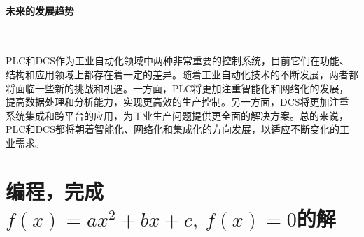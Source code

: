 \documentclass[UTF8]{article}
\begin{document}
\paragraph{未来的发展趋势}~{}

PLC和DCS作为工业自动化领域中两种非常重要的控制系统，目前它们在功能、结构和应用领域上都存在着一定的差异。随着工业自动化技术的不断发展，两者都将面临一些新的挑战和机遇。一方面，PLC将更加注重智能化和网络化的发展，提高数据处理和分析能力，实现更高效的生产控制。另一方面，DCS将更加注重系统集成和跨平台的应用，为工业生产问题提供更全面的解决方案。总的来说，PLC和DCS都将朝着智能化、网络化和集成化的方向发展，以适应不断变化的工业需求。

\section{编程，完成$f(x) = ax^2 + bx + c,\ f(x) = 0$的解}

\end{document}
